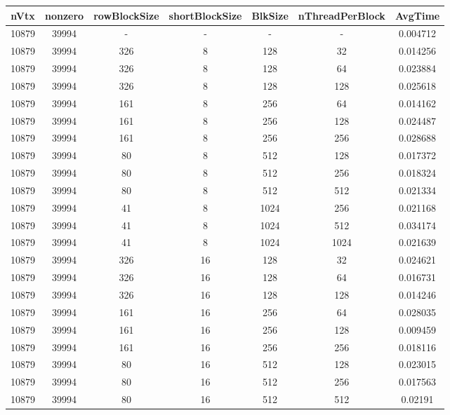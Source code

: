 \documentclass[9pt]{article}
\begin{document}
\SetBgPosition{0.25cm,-5.0cm}
\begin{tabular}{|c|c|c|c|c|c|c| }  
\hline
nVtx  & nonzero  & rowBlockSize  & shortBlockSize  & BlkSize  & nThreadPerBlock  & AvgTime \\
\hline
10879  & 39994  &  -  & -  & -  & -  &0.004712 \\
\hline
10879  & 39994  & 326  & 8  & 128  & 32  & 0.014256 \\
\hline
10879  & 39994  & 326  & 8  & 128  & 64  & 0.023884 \\
\hline
10879  & 39994  & 326  & 8  & 128  & 128  & 0.025618 \\
\hline
10879  & 39994  & 161  & 8  & 256  & 64  & 0.014162 \\
\hline
10879  & 39994  & 161  & 8  & 256  & 128  & 0.024487 \\
\hline
10879  & 39994  & 161  & 8  & 256  & 256  & 0.028688 \\
\hline
10879  & 39994  & 80  & 8  & 512  & 128  & 0.017372 \\
\hline
10879  & 39994  & 80  & 8  & 512  & 256  & 0.018324 \\
\hline
10879  & 39994  & 80  & 8  & 512  & 512  & 0.021334 \\
\hline
10879  & 39994  & 41  & 8  & 1024  & 256  & 0.021168 \\
\hline
10879  & 39994  & 41  & 8  & 1024  & 512  & 0.034174 \\
\hline
10879  & 39994  & 41  & 8  & 1024  & 1024  & 0.021639 \\
\hline
10879  & 39994  & 326  & 16  & 128  & 32  & 0.024621 \\
\hline
10879  & 39994  & 326  & 16  & 128  & 64  & 0.016731 \\
\hline
10879  & 39994  & 326  & 16  & 128  & 128  & 0.014246 \\
\hline
10879  & 39994  & 161  & 16  & 256  & 64  & 0.028035 \\
\hline
10879  & 39994  & 161  & 16  & 256  & 128  & 0.009459 \\
\hline
10879  & 39994  & 161  & 16  & 256  & 256  & 0.018116 \\
\hline
10879  & 39994  & 80  & 16  & 512  & 128  & 0.023015 \\
\hline
10879  & 39994  & 80  & 16  & 512  & 256  & 0.017563 \\
\hline
10879  & 39994  & 80  & 16  & 512  & 512  & 0.02191 \\

\end{tabular}
\end{document}
